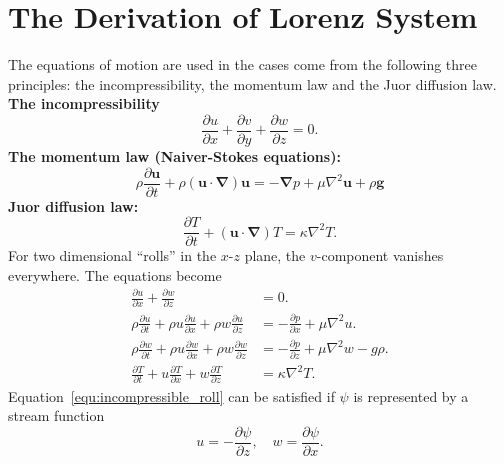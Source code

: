 \chapter{\label{chap:03}The Derivation of Lorenz System}

The equations of motion are used in the cases come from the following three principles: the incompressibility, the momentum law and the Juor diffusion law.\\
\textbf{The incompressibility}
\begin{equation}
\frac{\partial u}{\partial x}+\frac{\partial v}{\partial y}+\frac{\partial w}{\partial z}=0.
\label{equ:incompressibility}
\end{equation}
\textbf{The momentum law (Naiver-Stokes equations):}
\begin{equation}
\rho\frac{\partial \boldsymbol{u}}{\partial t}+\rho\left(\boldsymbol{u}\cdot\boldsymbol{\nabla}\right)\boldsymbol{u}=-\boldsymbol{\nabla}p+\mu\nabla^2\boldsymbol{u}+\rho\boldsymbol{g}
\label{equ:naiver_stokes}
\end{equation}
\noindent \textbf{Juor diffusion law:}
\begin{equation}
\frac{\partial T}{\partial t}+\left(\boldsymbol{u}\cdot\boldsymbol{\nabla}\right)T=\kappa\nabla^2 T.
\label{equ:jour_diffusion}
\end{equation}
For two dimensional ``rolls'' in the \(x\)-\(z\) plane, the \(v\)-component vanishes everywhere. The equations become
\begin{align}
	\frac{\partial u}{\partial x}+\frac{\partial w}{\partial z}&=0.\label{equ:incompressible_roll}\\
	\rho\frac{\partial u}{\partial t}+\rho u\frac{\partial u}{\partial x}+\rho w\frac{\partial u}{\partial z}&=-\frac{\partial p}{\partial x}+\mu\nabla^2 u.\label{equ:navier_stokes_roll_1}\\
	\rho\frac{\partial w}{\partial t}+\rho u\frac{\partial w}{\partial x}+\rho w\frac{\partial w}{\partial z}&=
		-\frac{\partial p}{\partial z}+\mu\nabla^2 w-g\rho.\label{equ:navier_stokes_roll_2}\\
	\frac{\partial T}{\partial t}+u\frac{\partial T}{\partial x}+w\frac{\partial T}{\partial z}&=\kappa\nabla^2 T.\label{equ:heat_defusion_roll}
\end{align}
Equation~\ref{equ:incompressible_roll} can be satisfied if \(\psi\) is represented by a stream function 
\begin{equation}
	u=-\frac{\partial \psi}{\partial z},\quad w=\frac{\partial \psi}{\partial x}.
	\label{equ:stream_function}
\end{equation}
